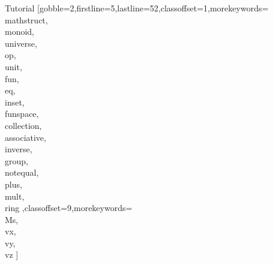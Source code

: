 \documentclass[lang={en,de}]{stex}
\begin{document}
\begin{sfragment}{Tutorial}
    [gobble=2,firstline=5,lastline=52,classoffset=1,morekeywords={
    \\mathstruct,\\monoid,\\universe,\\op,\\unit,\\fun,\\eq,\\inset,
    \\funspace,\\collection,\\associative,\\inverse,\\group,\\notequal,
    \\plus,\\mult,\\ring
    },classoffset=9,morekeywords={
      \\Ms,\\vx,\\vy,\\vz
    }]

  \end{sfragment}
  
\end{document}
